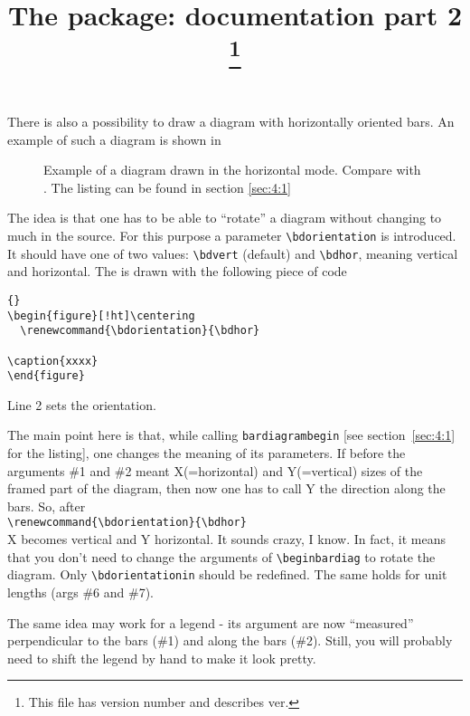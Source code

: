 \documentclass[12pt]{article}
\title{The \bard package: documentation part 2
       \thanks{This file has version number \barvers and describes \bard ver.\barvers}
}
\begin{document}
\maketitle

\setcounter{section}{3}

There is also a possibility to draw a diagram with horizontally oriented
bars. An example of such a diagram is shown in 

\begin{figure}[!ht]\centering
  \renewcommand{\bdorientation}{\bdhor}
  
\caption{\label{fig4:1} Example of a diagram drawn in the horizontal mode. 
          Compare with {}. The listing can be found in 
          section \ref{sec:4:1}}
\end{figure}

The idea is that one has to be able to ``rotate'' a diagram without
changing to much in the source. For this purpose a parameter
\verb+\bdorientation+ is introduced. It should have one of two values:
\verb+\bdvert+ (default) and \verb+\bdhor+, meaning vertical and
horizontal. The  is drawn with the following piece of
code
\begin{lstlisting}{}
\begin{figure}[!ht]\centering
  \renewcommand{\bdorientation}{\bdhor}
  
\caption{xxxx}
\end{figure}
\end{lstlisting}
\noindent
Line 2 sets the orientation. 

The main point here is that, while calling \texttt{bardiagrambegin}
[see section~\ref{sec:4:1} for the listing], one changes the meaning
of its parameters. If before the arguments \#1 and \#2  meant X(=horizontal) and
Y(=vertical) sizes of the framed part of the diagram, then now one has
to call Y the direction along the bars. So, after\\
\verb+\renewcommand{\bdorientation}{\bdhor}+\\
X becomes vertical and Y horizontal. It sounds crazy, I know. 
In fact, it means that you don't need to change the arguments
of \verb+\beginbardiag+ to
rotate the diagram. Only  \verb+\bdorientationin+ should be
redefined. The same holds for unit lengths (args \#6 and \#7).

The same idea may work for a legend - its argument are now ``measured''
perpendicular to the bars (\#1) and along the bars (\#2). Still, you
will probably need to shift the legend by hand to make it look pretty.
\end{document}
